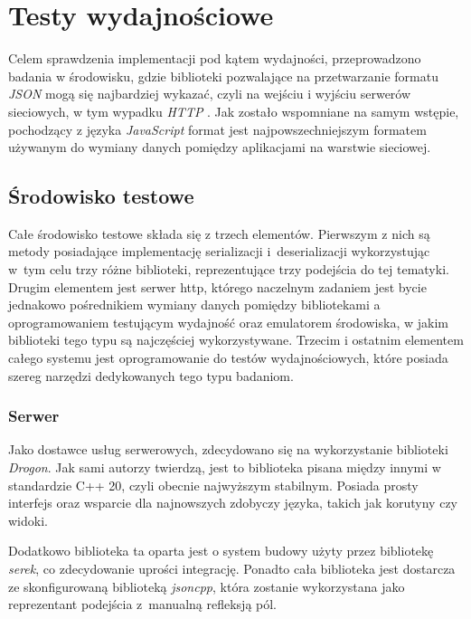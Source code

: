 \documentclass[12pt]{article}
\newcommand{\n}{\newline}
\newcommand{\nonpl}[1]{{\it #1}}
\newcommand{\JSON}{\nonpl{JSON} }
\newcommand{\HTTP}{\nonpl{HTTP} }
\newcommand{\serek}{\nonpl{serek}}
\begin{document}
	{
		\section{Testy wydajnościowe}

		Celem sprawdzenia implementacji pod kątem wydajności, przeprowadzono badania w środowisku, gdzie biblioteki pozwalające na przetwarzanie
		formatu \JSON mogą się najbardziej wykazać, czyli na wejściu i wyjściu serwerów sieciowych, w tym wypadku \HTTP. Jak zostało wspomniane
		na samym wstępie, pochodzący z języka \nonpl{JavaScript} format jest najpowszechniejszym formatem \cite{google_trends_json_api_vs_rest_of_the_world}
		używanym do wymiany danych pomiędzy aplikacjami na warstwie sieciowej.

		{
			\subsection{Środowisko testowe}

			Całe środowisko testowe składa się z trzech elementów. Pierwszym z nich są metody posiadające implementację serializacji i~deserializacji
			wykorzystując w~tym celu trzy różne biblioteki, reprezentujące trzy podejścia do tej tematyki. Drugim elementem jest serwer http, którego
			naczelnym zadaniem jest bycie jednakowo pośrednikiem wymiany danych pomiędzy bibliotekami a oprogramowaniem testującym wydajność oraz
			emulatorem środowiska, w jakim biblioteki tego typu są najczęściej wykorzystywane. Trzecim i ostatnim elementem całego systemu jest
			oprogramowanie do testów wydajnościowych, które posiada szereg narzędzi dedykowanych tego typu badaniom.

			{
				\subsubsection{Serwer}

				Jako dostawce usług serwerowych, zdecydowano się na wykorzystanie biblioteki \nonpl{Drogon}\cite{drogon}. Jak sami autorzy twierdzą,
				jest to biblioteka pisana między innymi w standardzie C++ 20, czyli obecnie najwyższym stabilnym. Posiada prosty interfejs oraz
				wsparcie dla najnowszych zdobyczy języka, takich jak korutyny czy widoki.\n

				Dodatkowo biblioteka ta oparta jest o system budowy użyty przez bibliotekę \serek, co zdecydowanie uprości integrację. Ponadto
				cała biblioteka jest dostarcza ze skonfigurowaną biblioteką \nonpl{jsoncpp}\cite{jsoncpp_repo}, która zostanie wykorzystana jako
				reprezentant podejścia z~manualną refleksją pól.\n

}}}
\end{document}
